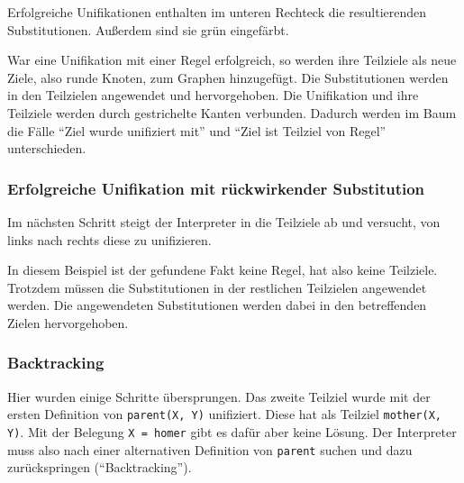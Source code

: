 \documentclass[parskip=full,11pt,twoside]{scrartcl}
\begin{document}
\begin{minipage}{\linewidth}
\end{minipage}

Erfolgreiche Unifikationen enthalten im unteren Rechteck die resultierenden Substitutionen.
Außerdem sind sie grün eingefärbt.

War eine Unifikation mit einer Regel erfolgreich, so werden ihre Teilziele als neue Ziele, also runde Knoten, zum Graphen hinzugefügt.
Die Substitutionen werden in den Teilzielen angewendet und hervorgehoben.
Die Unifikation und ihre Teilziele werden durch gestrichelte Kanten verbunden.
Dadurch werden im Baum die Fälle \enquote{Ziel wurde unifiziert mit} und \enquote{Ziel ist Teilziel von Regel} unterschieden.

\subsubsection{Erfolgreiche Unifikation mit rückwirkender Substitution}

Im nächsten Schritt steigt der Interpreter in die Teilziele ab und versucht, von links nach rechts diese zu unifizieren.

\begin{minipage}{\linewidth}
\end{minipage}

In diesem Beispiel ist der gefundene Fakt keine Regel, hat also keine Teilziele.
Trotzdem müssen die Substitutionen in der restlichen Teilzielen angewendet werden.
Die angewendeten Substitutionen werden dabei in den betreffenden Zielen hervorgehoben.

\subsubsection{Backtracking}

Hier wurden einige Schritte übersprungen.
Das zweite Teilziel wurde mit der ersten Definition von \texttt{parent(X, Y)} unifiziert.
Diese hat als Teilziel \texttt{mother(X, Y)}.
Mit der Belegung \texttt{X = homer} gibt es dafür aber keine Lösung.
Der Interpreter muss also nach einer alternativen Definition von \texttt{parent} suchen und dazu zurückspringen (\enquote{Backtracking}).
\end{document}
